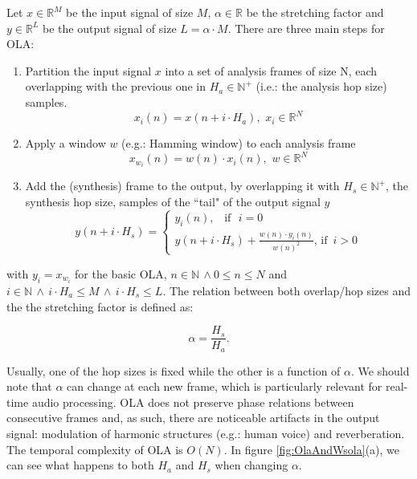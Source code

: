 \documentclass{sig-alternate}
\begin{document}
 Let $x \in \mathbb{R}^M$ be the input signal of size $M$, $\alpha \in \mathbb{R}$ be the stretching factor and $y \in \mathbb{R}^L$ be the output signal of size $L=\alpha \cdot M$. There are three main steps for OLA:
\begin{enumerate}
	\item Partition the input signal $x$ into a set of analysis frames of size N, each overlapping with the previous one in $H_a \in \mathbb{N}^+$ (i.e.: the analysis hop size) samples.
\begin{equation}
x_i(n) = x(n + i \cdot H_a), \,\, x_i \in \mathbb{R}^N
\end{equation}
	\item Apply a window $w$ (e.g.: Hamming window) to each analysis frame
\begin{equation}
x_{w_i}(n) = w(n) \cdot x_i(n), \,\, w \in \mathbb{R}^N
\end{equation}
	\item Add the (synthesis) frame to the output, by overlapping it with $H_s \in \mathbb{N}^+$, the synthesis hop size, samples of the ``tail" of the output signal $y$
\begin{equation}
y(n+i \cdot H_s) = \left\{\begin{array}{lll}
	y_i(n),\,\,\,\,\,\textrm{if}\,\,\,\,i=0 \\
	y(n+i \cdot H_s) + \frac{w(n) \cdot y_i(n)}{w(n)^2},\,\textrm{if}\,\,\,i>0
	\end{array}\right.
\end{equation}
\end{enumerate}
with $y_i = x_{w_i}$ for the basic OLA, $n \in \mathbb{N} \, \land 0 \leq n \leq N$ and $i \in \mathbb{N} \, \land \, i \cdot H_a \leq M \, \land \, i \cdot H_s \leq L$. The relation between both overlap/hop sizes and the the stretching factor is defined as:

\begin{equation}
\alpha = \frac{H_s}{H_a}. %
\end{equation}

Usually, one of the hop sizes is fixed while the other is a function of $\alpha$. We should note that $\alpha$ can change at each new frame, which is particularly relevant for real-time audio processing. OLA does not preserve phase relations between consecutive frames and, as such, there are noticeable artifacts in the output signal: modulation of harmonic structures (e.g.: human voice) and reverberation. The temporal complexity of OLA is $O(N)$. In figure \ref{fig:OlaAndWsola}(a), we can see what happens to both $H_a$ and $H_s$ when changing $\alpha$.
\end{document}
